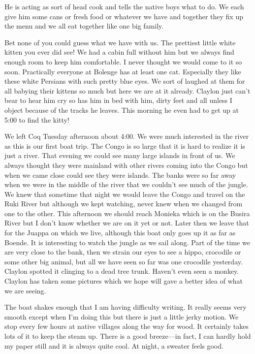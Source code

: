 \documentclass[
]{book}
\begin{document}
He is acting as sort of head cook and tells the native boys what to do. We each give him some cans or fresh food or whatever we have and together they fix up the menu and we all eat together like one big family.

Bet none of you could guess what we have with us. The prettiest little white kitten you ever did see! We had a cabin full without him but we always find enough room to keep him comfortable. I never thought we would come to it so soon. Practically everyone at Bolenge has at least one cat. Especially they like these white Persians with such pretty blue eyes. We sort of laughed at them for all babying their kittens so much but here we are at it already. Claylon just can't bear to hear him cry so has him in bed with him, dirty feet and all unless I object because of the tracks he leaves. This morning he even had to get up at 5:00 to find the kitty!

We left Coq Tuesday afternoon about 4:00. We were much interested in the river as this is our first boat trip. The Congo is so large that it is hard to realize it is just a river. That evening we could see many large islands in front of us. We always thought they were mainland with other rivers coming into the Congo but when we came close could see they were islands. The banks were so far away when we were in the middle of the river that we couldn't see much of the jungle. We knew that sometime that night we would leave the Congo and travel on the Ruki River but although we kept watching, never knew when we changed from one to the other. This afternoon we should reach Monieka which is on the Busira River but I don't know whether we are on it yet or not. Later then we leave that for the Juappa on which we live, although this boat only goes up it as far as Boende. It is interesting to watch the jungle as we sail along. Part of the time we are very close to the bank, then we strain our eyes to see a hippo, crocodile or some other big animal, but all we have seen so far was one crocodile yesterday. Claylon spotted it clinging to a dead tree trunk. Haven't even seen a monkey. Claylon has taken some pictures which we hope will gave a better idea of what we are seeing.

The boat shakes enough that I am having difficulty writing. It really seems very smooth except when I'm doing this but there is just a little jerky motion. We stop every few hours at native villages along the way for wood. It certainly takes lots of it to keep the steam up. There is a good breeze---in fact, I can hardly hold my paper still and it is always quite cool. At night, a sweater feels good.
\end{document}
